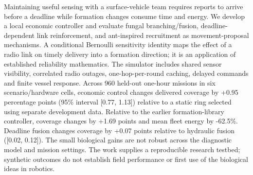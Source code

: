 Maintaining useful sensing with a surface-vehicle team requires reports to arrive before a deadline while formation changes consume time and energy. We develop a local economic controller and evaluate fungal branching/fusion, deadline-dependent link reinforcement, and ant-inspired recruitment as movement-proposal mechanisms. A conditional Bernoulli sensitivity identity maps the effect of a radio link on timely delivery into a formation direction; it is an application of established reliability mathematics. The simulator includes shared sensor visibility, correlated radio outages, one-hop-per-round caching, delayed commands and finite vessel response. Across 960 held-out one-hour missions in six scenario/hardware cells, economic control changes delivered coverage by +0.95 percentage points (95\% interval [0.77, 1.13]) relative to a static ring selected using separate development data. Relative to the earlier formation-library controller, coverage changes by +1.69 points and mean fleet energy by -62.5\%. Deadline fusion changes coverage by +0.07 points relative to hydraulic fusion ([0.02, 0.12]). The small biological gains are not robust across the diagnostic model and mission settings. The work supplies a reproducible research testbed; synthetic outcomes do not establish field performance or first use of the biological ideas in robotics.

